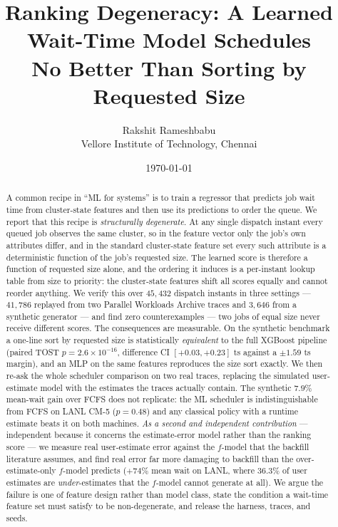 \documentclass[11pt,twocolumn]{article}
\title{Ranking Degeneracy: A Learned Wait-Time Model Schedules\\
       No Better Than Sorting by Requested Size}
\author{
  Rakshit Rameshbabu \\
  \small Vellore Institute of Technology, Chennai
}
\date{\today}
\begin{document}
\maketitle

\begin{abstract}
A common recipe in ``ML for systems'' is to train a regressor that predicts job
wait time from cluster-state features and then use its predictions to order the
queue. We report that this recipe is \emph{structurally degenerate}. At any
single dispatch instant every queued job observes the same cluster, so in the
feature vector only the job's own attributes differ, and in the standard
cluster-state feature set every such attribute is a deterministic function of
the job's requested size. The learned score is therefore a function of
requested size alone, and the ordering it induces is a per-instant lookup table
from size to priority: the cluster-state features shift all scores equally and
cannot reorder anything. We verify this over $45{,}432$ dispatch instants in three
settings --- $41{,}786$ replayed from two Parallel Workloads Archive traces and
$3{,}646$ from a synthetic generator --- and find zero counterexamples --- two jobs of equal size never receive
different scores. The consequences are measurable. On the synthetic benchmark a
one-line sort by requested size is statistically \emph{equivalent} to the full
XGBoost pipeline (paired TOST $p = 2.6\times10^{-16}$, difference CI
$[+0.03, +0.23]$ ts against a $\pm 1.59$ ts margin), and an MLP on the same
features reproduces the size sort exactly. We then re-ask the whole scheduler
comparison on two real traces, replacing the simulated user-estimate model with
the estimates the traces actually contain. The synthetic $7.9\%$ mean-wait gain
over FCFS does not replicate: the ML scheduler is indistinguishable from FCFS on
LANL CM-5 ($p = 0.48$) and any classical policy with a runtime estimate beats it
on both machines. \emph{As a second and independent contribution} --- independent
because it concerns the estimate-error model rather than the ranking score --- we
measure real user-estimate error against the $f$-model that the backfill
literature assumes, and find real error far more damaging to backfill than the
over-estimate-only $f$-model predicts ($+74\%$ mean wait on
LANL, where $36.3\%$ of user estimates are \emph{under}-estimates that the
$f$-model cannot generate at all). We argue the failure is one of feature design rather
than model class, state the condition a wait-time feature set must satisfy to be
non-degenerate, and release the harness, traces, and seeds.
\end{abstract}
\end{document}

